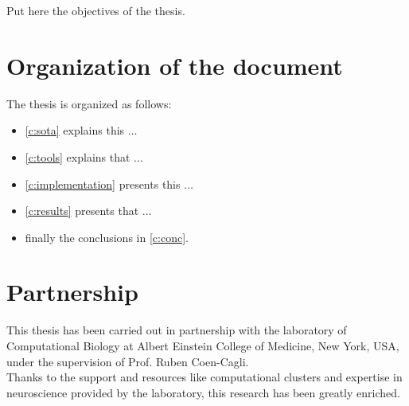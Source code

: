 %
%
Put here the objectives of the thesis.

\section{Organization of the document}

The thesis is organized as follows:

%
%
\begin{itemize}
\item \cref{c:sota} explains this $\ldots$
\item \cref{c:tools} explains that $\ldots$
\item \cref{c:implementation} presents this $\ldots$
\item \cref{c:results} presents that $\ldots$
\item finally the conclusions in \cref{c:conc}.
\end{itemize}
\fi

\section{Partnership}

This thesis has been carried out in partnership with the laboratory of Computational Biology at Albert Einstein College of Medicine, New York, USA, under the supervision of Prof. Ruben Coen-Cagli.\\
Thanks to the support and resources like computational clusters and expertise in neuroscience provided by the laboratory, this research has been greatly enriched.
